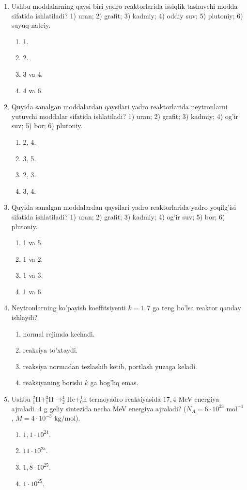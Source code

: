 \begin{enumerate}
\item Ushbu moddalarning qaysi biri yadro reaktorlarida issiqlik tashuvchi modda sifatida ishlatiladi?
1) uran; 2) grafit; 3) kadmiy; 4) oddiy suv; 5) plutoniy; 6) suyuq natriy.
\begin{enumerate}[label=\Alph*)]
\item 1.
\item 2.
\item 3 va 4.
\item 4 va 6.
\end{enumerate}

\item Quyida sanalgan moddalardan qaysilari yadro reaktorlarida neytronlarni yutuvchi moddalar sifatida ishlatiladi?
1) uran; 2) grafit; 3) kadmiy; 4) og'ir suv; 5) bor; 6) plutoniy.
\begin{enumerate}[label=\Alph*)]
\item 2, 4.
\item 3, 5.
\item 2, 3.
\item 3, 4.
\end{enumerate}

\item Quyida sanalgan moddalardan qaysilari yadro reaktorlarida yadro yoqilg'isi sifatida ishlatiladi?
1) uran; 2) grafit; 3) kadmiy; 4) og'ir suv; 5) bor; 6) plutoniy.
\begin{enumerate}[label=\Alph*)]
\item 1 va 5.
\item 1 va 2.
\item 1 va 3.
\item 1 va 6.
\end{enumerate}

\item Neytronlarning ko'payish koeffitsiyenti $k=1,7$ ga teng bo'lsa reaktor qanday ishlaydi?
\begin{enumerate}[label=\Alph*)]
\item normal rejimda kechadi.
\item reaksiya to'xtaydi.
\item reaksiya normadan tezlashib ketib, portlash yuzaga keladi.
\item reaksiyaning borishi $k$ ga bog'liq emas.
\end{enumerate}

\setcounter{enumi}{28}
\item Ushbu $^2_1\text{H} + ^3_1\text{H} \rightarrow ^4_2\text{He} + ^1_0\text{n}$ termoyadro reaksiyasida $17,4$ MeV energiya ajraladi. $4$ g geliy sintezida necha MeV energiya ajraladi? ($N_A=6\cdot 10^{23}\text{ mol}^{-1}$, $M=4\cdot 10^{-3}\text{ kg/mol}$).
\begin{enumerate}[label=\Alph*)]
\item $1,1\cdot 10^{24}$.
\item $11\cdot 10^{25}$.
\item $1,8\cdot 10^{25}$.
\item $1\cdot 10^{25}$.
\end{enumerate}


\end{enumerate}

